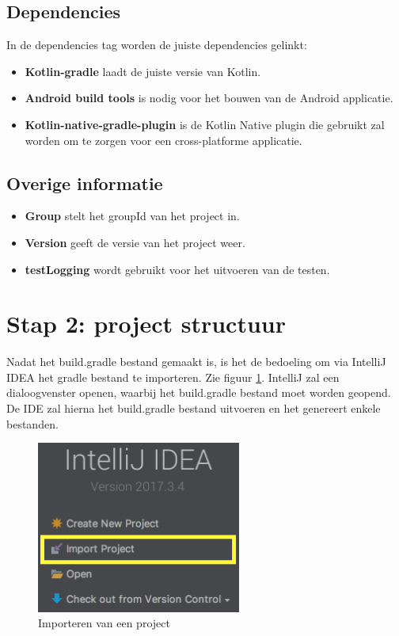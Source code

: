 \subsection{Dependencies}
In de dependencies tag worden de juiste dependencies gelinkt:
\begin{itemize}
	\item \textbf{Kotlin-gradle} laadt de juiste versie van Kotlin.
	\item \textbf{Android build tools} is nodig voor het bouwen van de Android applicatie.
	\item \textbf{Kotlin-native-gradle-plugin} is de Kotlin Native plugin die gebruikt zal worden om te zorgen voor een cross-platforme applicatie.
\end{itemize}

\subsection{Overige informatie}
\label{sec:overige}
\begin{itemize}
	\item \textbf{Group} stelt het groupId van het project in.
	\item \textbf{Version} geeft de versie van het project weer.
	\item \textbf{testLogging} wordt gebruikt voor het uitvoeren van de testen.
\end{itemize}

\section{Stap 2: project structuur}
Nadat het build.gradle bestand gemaakt is, is het de bedoeling om via IntelliJ IDEA het gradle bestand te importeren. Zie figuur \ref{fig:stap2-import}. IntelliJ zal een dialoogvenster openen, waarbij het build.gradle bestand moet worden geopend. De IDE zal hierna het build.gradle bestand uitvoeren en het genereert enkele bestanden.

\begin{figure} [ht]
	\centering
	\includegraphics[width=0.60\textwidth]{img/stap2-import.png}
	\caption{Importeren van een project}
	\label{fig:stap2-import}
\end{figure}

